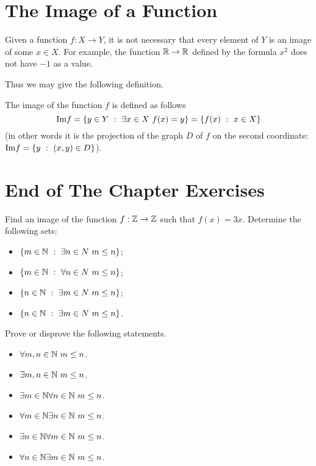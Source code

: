 \section{The Image of a Function}
Given a function $f : X \to Y$, it is not necessary that every element of $Y$
is an image of some $x \in X$. For example, the function $\mathbb{R} \to \mathbb{R}$ defined by
the formula $x^2$ does not have $-1$ as a value.

Thus we may give the following definition.
\begin{definition}
  The image of the function $f$ is defined as follows
  $$\textrm{Im} f = \set[\exists x \in X\ f(x) = y]{y \in Y}
  = \set[x \in X]{f(x)}$$ (in other
  words it is the projection of the graph $D$ of $f$ on the second coordinate:
  $\mathrm{Im} f = \set[(x, y) \in D]{y}$).
\end{definition}

\section*{End of The Chapter Exercises}
\begin{exercises}
  \exerciseitem Find an image of the function $f : \mathbb{Z} \to \mathbb{Z}$ such that
    $f(x) = 3x$.
  \exerciseitem Determine the following sets:
    \begin{itemize}
      \item $\set[\exists n \in N \ m \le n]{m \in \N}$;
      \item $\set[\forall n \in N \ m \le n]{m \in \N}$;
      \item $\set[\exists m \in N \ m \le n]{n \in \N}$;
      \item $\set[\exists m \in N \ m \le n]{n \in \N}$.
    \end{itemize}
  \exerciseitem Prove or disprove the following statements.
    \begin{itemize}
      \item $\forall m, n \in \mathbb{N} \ m \le n$.
      \item $\exists m, n \in \mathbb{N} \ m \le n$.
      \item $\exists m \in \mathbb{N} \forall n \in \mathbb{N} \ m \le n$.
      \item $\forall m \in \mathbb{N} \exists n \in \mathbb{N} \ m \le n$.
      \item $\exists n \in \mathbb{N} \forall m \in \mathbb{N} \ m \le n$.
      \item $\forall n \in \mathbb{N} \exists m \in \mathbb{N} \ m \le n$.
    \end{itemize}
\end{exercises}
